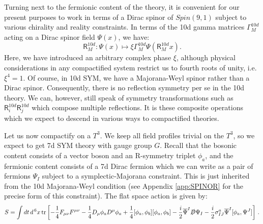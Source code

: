\documentclass[12pt]{article}%
\numberwithin{equation}{section}
\newcommand{\al}[1]{\begin{align}#1\end{align}}
\renewcommand{\(}{\left(}
\renewcommand{\)}{\right)}
\renewcommand{\[}{\left[}
\renewcommand{\]}{\right]}
\begin{document}
Turning next to the fermionic content of the theory, it is convenient
for our present purposes to work in terms of a Dirac spinor of $Spin(9,1)$
subject to various chirality and reality constraints. In terms of the 10d gamma matrices $\Gamma^{10d}_{M}$
acting on a Dirac spinor field
$\Psi(x)$, we have:
\begin{equation}\label{eqn:10dgaugino}
\mathsf{R}^{10d}_{M} : \Psi(x) \mapsto  \xi \Gamma^{10d}_{M} \Psi( \mathsf{R}^{10d}_{M} x).
\end{equation}
Here, we have introduced an arbitrary complex phase $\xi$, although physical considerations in any compactified
system restrict us to fourth roots of unity, i.e. $\xi^{4} = 1$. Of course, in 10d SYM, we have a Majorana-Weyl
spinor rather than a Dirac spinor. Consequently, there is no reflection symmetry per se in the 10d theory. We can, however,
still speak of symmetry transformations such as $\mathsf{R}^{10d}_{i} \mathsf{R}^{10d}_j$ which compose multiple reflections.
It is these composite operations which we expect to descend in various ways to compactified theories.

Let us now compactify on a $T^3$. We keep all field profiles trivial on the $T^3$, so we expect to get 7d SYM theory with gauge group $G$. Recall that the bosonic content consists of a vector boson and an R-symmetry triplet $\phi_a$, and the fermionic content consists of a
7d Dirac fermion which we can write as a pair of fermions $\Psi_I$ subject to a
symplectic-Majorana constraint. This is just inherited from the 10d Majorana-Weyl condition (see Appendix \ref{app:SPINOR}
for the precise form of this constraint). The flat space action is given by:
\al{S = \int dt\,d^{\,6}x\, \text{tr}\left[-\frac{1}{4} F_{\mu \nu} F^{\mu \nu}-\frac{1}{4} D_\mu \phi_a D^\mu \phi_a+ \frac{1}{4} [\phi_a,\phi_b][\phi_a,\phi_b]-\frac{i}{2} \overline{\Psi}^I \slashed{D}\Psi_I-\frac{i}{2} \sigma^a_{IJ}\overline \Psi^I [\phi_a,\Psi^J]\right]\,.
}
\end{document}

